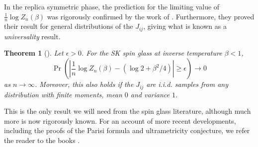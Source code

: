 \documentclass[11pt, oneside, english]{article}
\newtheorem{theorem}{Theorem}[section]
\theoremstyle{definition}
\theoremstyle{plain}
\begin{document}
In the replica symmetric phase, the prediction for the limiting value of $\frac{1}{n} \log Z_{n}(\beta)$ was rigorously confirmed by the work of \cite{aizenman1987}. %
Furthermore, they proved their result for general distributions of the $J_{ij}$, giving what is known as a \emph{universality} result.
\begin{theorem}[\cite{aizenman1987}]\label{thm:rs-correct}
Let $\epsilon > 0$. For the SK spin glass at inverse temperature $\beta < 1$,
\[ \Pr\left(\left|\frac{1}{n} \log Z_{n}(\beta) - (\log 2 + \beta^2/4)\right| \ge \epsilon\right) \to 0 \]
as $n \to \infty$. Moreover, this also holds if the $J_{ij}$ are i.i.d. samples from \emph{any} distribution with finite moments, mean $0$ and variance $1$. %
\end{theorem}
This is the only result we will need from the spin glass literature, although much more is now rigorously known. 
For an account of more recent developments, including the proofs of the Parisi formula and ultrametricity conjecture, we refer the reader to the books \cite{panchenko2013sherrington,Talagrand:11,talagrand2011mean}.
\end{document}
